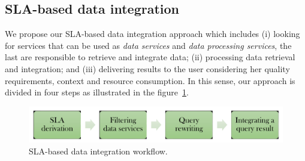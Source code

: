 \subsection{SLA-based data integration}
We propose our SLA-based data integration approach which includes (i) looking for services that can be used as \textit{data services} and \textit{data processing services}, the last are responsible to retrieve and integrate data; (ii) processing data retrieval and integration; and (iii) delivering results to the user considering her quality requirements, context and resource consumption.  In this sense, our approach is divided in four steps as illustrated in the figure~\ref{fig:generalapproach}. 
\begin{figure}[h!]
\centering
\includegraphics[scale=0.4]{workflow-approach.pdf}
\caption{SLA-based data integration workflow.}
\label{fig:generalapproach}
\end{figure}

